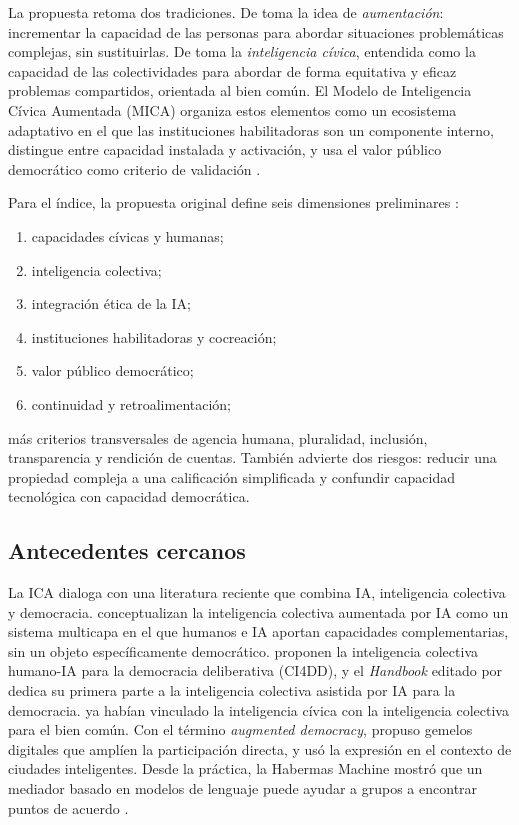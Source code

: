 \documentclass[11pt,a4paper]{article}
\begin{document}
La propuesta retoma dos tradiciones. De \textcite{engelbart_1962} toma la idea de \emph{aumentación}: incrementar la capacidad de las personas para abordar situaciones problemáticas complejas, sin sustituirlas. De \textcite{schuler_2001,schuler_2014} toma la \emph{inteligencia cívica}, entendida como la capacidad de las colectividades para abordar de forma equitativa y eficaz problemas compartidos, orientada al bien común. El Modelo de Inteligencia Cívica Aumentada (MICA) organiza estos elementos como un ecosistema adaptativo en el que las instituciones habilitadoras son un componente interno, distingue entre capacidad instalada y activación, y usa el valor público democrático \parencite{moore_1995} como criterio de validación \parencite{zenteno_ica_2026}.

Para el índice, la propuesta original define seis dimensiones preliminares \parencite{zenteno_ica_2026}:
\begin{enumerate}
  \item capacidades cívicas y humanas;
  \item inteligencia colectiva;
  \item integración ética de la IA;
  \item instituciones habilitadoras y cocreación;
  \item valor público democrático;
  \item continuidad y retroalimentación;
\end{enumerate}
más criterios transversales de agencia humana, pluralidad, inclusión, transparencia y rendición de cuentas. También advierte dos riesgos: reducir una propiedad compleja a una calificación simplificada y confundir capacidad tecnológica con capacidad democrática.

\subsection{Antecedentes cercanos}

La ICA dialoga con una literatura reciente que combina IA, inteligencia colectiva y democracia. \textcite{cui_yasseri_2024} conceptualizan la inteligencia colectiva aumentada por IA como un sistema multicapa en el que humanos e IA aportan capacidades complementarias, sin un objeto específicamente democrático. \textcite{deliddo_2026} proponen la inteligencia colectiva humano-IA para la democracia deliberativa (CI4DD), y el \emph{Handbook} editado por \textcite{pournaras_handbook_2026} dedica su primera parte a la inteligencia colectiva asistida por IA para la democracia. \textcite{schuler_ci4cg_2018} ya habían vinculado la inteligencia cívica con la inteligencia colectiva para el bien común. Con el término \emph{augmented democracy}, \textcite{hidalgo_2018} propuso gemelos digitales que amplíen la participación directa, y \textcite{pournaras_2020} usó la expresión en el contexto de ciudades inteligentes. Desde la práctica, la Habermas Machine mostró que un mediador basado en modelos de lenguaje puede ayudar a grupos a encontrar puntos de acuerdo \parencite{tessler_2024}.
\end{document}
